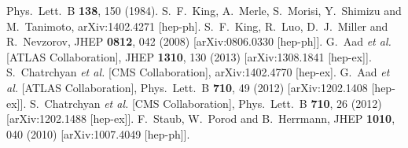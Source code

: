 \documentclass[final,3p,times,pdflatex]{elsarticle}
\begin{document}
\begin{thebibliography}{100}
  Phys.\ Lett.\ B {\bf 138}, 150 (1984).
  S.~F.~King, A.~Merle, S.~Morisi, Y.~Shimizu and M.~Tanimoto,
  arXiv:1402.4271 [hep-ph].
  S.~F.~King, R.~Luo, D.~J.~Miller and R.~Nevzorov,
  JHEP {\bf 0812}, 042 (2008)
  [arXiv:0806.0330 [hep-ph]].
  G.~Aad {\it et al.}  [ATLAS Collaboration],
  JHEP {\bf 1310}, 130 (2013)
  [arXiv:1308.1841 [hep-ex]].
  S.~Chatrchyan {\it et al.}  [CMS Collaboration],
  arXiv:1402.4770 [hep-ex].
  G.~Aad {\it et al.}  [ATLAS Collaboration],
  Phys.\ Lett.\ B {\bf 710}, 49 (2012)
  [arXiv:1202.1408 [hep-ex]].
  S.~Chatrchyan {\it et al.}  [CMS Collaboration],
  Phys.\ Lett.\ B {\bf 710}, 26 (2012)
  [arXiv:1202.1488 [hep-ex]].
  F.~Staub, W.~Porod and B.~Herrmann,
  JHEP {\bf 1010}, 040 (2010)
  [arXiv:1007.4049 [hep-ph]].


\end{thebibliography}
\end{document}
